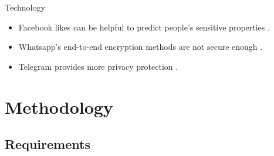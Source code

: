 \documentclass{beamer}
\begin{document}
\begin{frame}[fragile]{Technology}
  \begin{itemize}[<+->]
    \item Facebook likes can be helpful to predict people's sensitive properties \cite{Kosinski5802}.
    \item Whatsapp's end-to-end encryption methods are not secure enough \cite{Rastogi17}.
    \item Telegram provides more privacy protection \cite{Sutikno16}.
  \end{itemize}
\end{frame}

\section{Methodology}
\subsection{Requirements}
\end{document}
